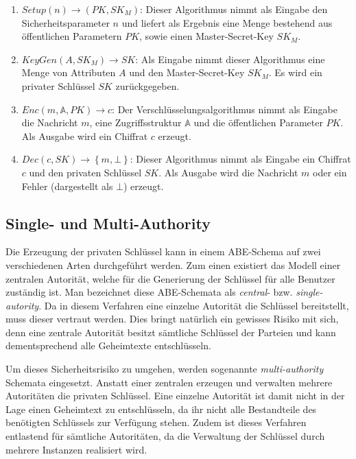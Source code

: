 \begin{enumerate}
	\item $\textit{Setup}\left(n\right) \to \left(PK, SK_M\right)$: Dieser
		Algorithmus nimmt als Eingabe den Sicherheitsparameter $n$ und liefert als
		Ergebnis eine Menge bestehend aus öffentlichen Parametern $PK$, sowie
		einen Master-Secret-Key $SK_M$.
	\item $\textit{KeyGen}\left(A, SK_M\right) \to SK$: Als Eingabe
		nimmt dieser Algorithmus eine Menge von Attributen $A$ und den
		Master-Secret-Key $SK_M$. Es wird ein privater Schlüssel $SK$
		zurückgegeben.
	\item $Enc\left(m, \mathbb{A}, PK\right) \to c$: Der
		Verschlüsselungsalgorithmus nimmt als Eingabe die Nachricht $m$, eine
		Zugriffsstruktur $\mathbb{A}$ und die öffentlichen Parameter $PK$.  Als
		Ausgabe wird ein Chiffrat $c$ erzeugt.
	\item $Dec\left(c, SK\right) \to \left\{m, \bot\right\}$: Dieser Algorithmus
		nimmt als Eingabe ein Chiffrat $c$ und den privaten Schlüssel $SK$. Als
		Ausgabe wird die Nachricht $m$ oder ein Fehler (dargestellt als $\bot$)
		erzeugt.
\end{enumerate}

\subsection{Single- und Multi-Authority}
Die Erzeugung der privaten Schlüssel kann in einem ABE-Schema auf zwei
verschiedenen Arten durchgeführt werden. Zum einen existiert das Modell einer
zentralen Autorität, welche für die Generierung der Schlüssel für alle
Benutzer zuständig ist. Man bezeichnet diese ABE-Schemata als
\textit{central}- bzw. \textit{single-autority}. Da in diesem Verfahren eine
einzelne Autorität die Schlüssel bereitstellt, muss dieser vertraut werden.
Dies bringt natürlich ein gewisses Risiko mit sich, denn eine zentrale
Autorität besitzt sämtliche Schlüssel der Parteien und kann dementsprechend
alle Geheimtexte entschlüsseln.

Um dieses Sicherheitsrisiko zu umgehen, werden sogenannte
\textit{multi-authority} Schemata eingesetzt. Anstatt einer zentralen erzeugen
und verwalten mehrere Autoritäten die privaten Schlüssel. Eine einzelne
Autorität ist damit nicht in der Lage einen Geheimtext zu entschlüsseln, da
ihr nicht alle Bestandteile des benötigten Schlüssels zur Verfügung stehen.
Zudem ist dieses Verfahren entlastend für sämtliche Autoritäten, da die
Verwaltung der Schlüssel durch mehrere Instanzen realisiert wird.
